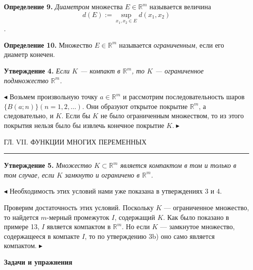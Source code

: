 \documentclass[a4paper, 12pt]{book}
\begin{document}
    \par\textbf{Определение 9.} \textit{Диаметром} множества $E \in \mathbb{R}^m$ называется величина \[d(E):= \sup_{x_1,x_2 \in E} d(x_1 , x_2 )\].
    \par\textbf{Определение 10.} Множество $E \in \mathbb{R}^m$ называется \textit{ограниченным}, если его диаметр конечен.
    \par\textbf{Утверждение 4.} \textit{Если $K$ — компакт в $\mathbb{R}^m$, то $K$ — ограниченное подмножество $\mathbb{R}^m$.}
    \par $\blacktriangleleft$ Возьмем произвольную точку $a \in \mathbb{R}^m$ и рассмотрим последовательность шаров $\{B(a; n)\} (n = 1, 2, \dots )$. Они образуют открытое покрытие $\mathbb{R}^m$, а следовательно, и $K$. Если бы $K$ не было ограниченным множеством, то из этого покрытия нельзя было бы извлечь конечное покрытие $K. \blacktriangleright$

    \newpage

    \begin{center}
            \begin{spacing}
            
                ГЛ. VII. ФУНКЦИИ МНОГИХ ПЕРЕМЕННЫХ
                \noindent\rule{\textwidth}{1pt}
            \end{spacing}
    \end{center}
    \par\textbf{Утверждение 5.} \textit{Множество $K \subset \mathbb{R}^m$ является компактом в том и только в том случае, если $K$ замкнуто и ограничено в $\mathbb{R}^m$.}
    \par $\blacktriangleleft$ Необходимость этих условий нами уже показана в утверждениях 3 и 4.
    {\setlength{\parskip}{0pt}
    \par Проверим достаточность этих условий. Поскольку $K$ — ограниченное множество, то найдется $m$-мерный промежуток $I$, содержащий $K$. Как было показано в примере 13, $I$ является компактом в $\mathbb{R}^m$. Но если $K$ — замкнутое множество, содержащееся в компакте $I$, то по утверждению 3b) оно само является компактом. $\blacktriangleright$}
    \par\textbf{Задачи и упражнения}
\end{document}
